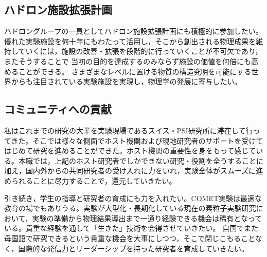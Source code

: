 %


\subsection{ハドロン施設拡張計画}
ハドロングループの一員としてハドロン施設拡張計画にも積極的に参加したい。
優れた実験施設を何十年にもわたって活用し，そこから創出される物理成果を維持していくには，施設の改善・拡張を段階的に行っていくことが不可欠であり，またそうすることで
当初の目的を達成するのみならず施設の価値を何倍にも高めることができる。
さまざまなレベルに置ける物質の構造究明を可能にする世界からも注目されている実験施設を実現し，物理学の発展に寄与したい。



\subsection{コミュニティへの貢献}
私はこれまでの研究の大半を実験現場であるスイス・PSI研究所に滞在して行ってきた。そこでは様々な側面でホスト機関および現地研究者のサポートを受けてはじめて研究を進めることができた。ホスト機関の重要性を身をもって感じている。本職では，上記のホスト研究者でしかできない研究・役割を全うすることに加え，国内外からの共同研究者の受け入れに力をいれ，実験全体がスムーズに進められることに尽力することで，還元していきたい。

引き続き，学生の指導と研究者の育成にも力を入れたい。COMET実験は最適な教育の場でもありうる。実験が大型化・長期化している現在の素粒子実験研究において，実験の準備から物理結果導出まで一通り経験できる機会は稀有となっている。貴重な経験を通して「生きた」技術を会得させていきたい。
自国でまた母国語で研究できるという貴重な機会を大事にしつつ，そこで閉じこもることなく，国際的な発信力とリーダーシップを持った研究者を育成していきたい。




